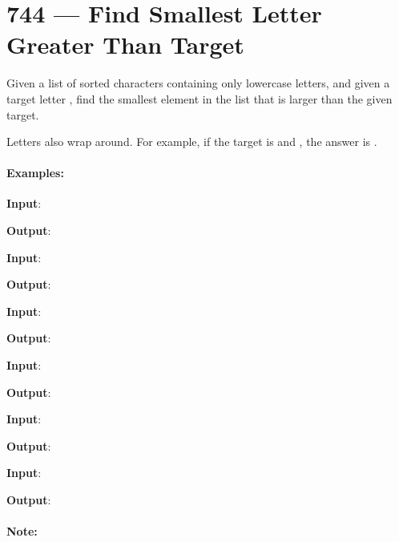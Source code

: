 \section{744 --- Find Smallest Letter Greater Than Target}
Given a list of sorted characters  containing only lowercase letters, and given a target letter , find the smallest element in the list that is larger than the given target.

Letters also wrap around. For example, if the target is  and , the answer is .


\paragraph{Examples:}
\begin{flushleft}
\textbf{Input}:



\textbf{Output}: 

\textbf{Input}:



\textbf{Output}: 

\textbf{Input}:



\textbf{Output}: 

\textbf{Input}:



\textbf{Output}: 

\textbf{Input}:



\textbf{Output}: 

\textbf{Input}:



\textbf{Output}: 

\end{flushleft}

\paragraph{Note:}


